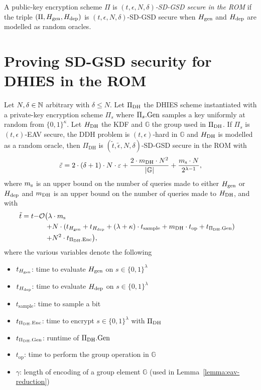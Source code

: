 \begin{definition}
	A public-key encryption scheme $\Pi$ is \emph{$(t, \epsilon, N, \delta)$-SD-GSD secure in the ROM} if the triple $(\Pi, H_\mathrm{gen}, H_\mathrm{dep})$ is $(t, \epsilon, N, \delta)$-SD-GSD secure when $H_\mathrm{gen}$ and $H_\mathrm{dep}$ are modelled as random oracles.
\end{definition}

\section{Proving SD-GSD security for DHIES in the ROM}


\begin{theorem} \label{theorem:sdgsd-security}
	Let $N, \delta \in \mathbb{N}$ arbitrary with $\delta \le N$. Let $\Pi_{\mathrm{DH}}$ the DHIES scheme instantiated with a private-key encryption scheme $\Pi_s$ where $\Pi_s.\mathrm{Gen}$ samples a key uniformly at random from $\{0, 1\}^\kappa$. Let $H_\mathrm{DH}$ the KDF and $\mathbb{G}$ the group used in $\Pi_{\mathrm{DH}}$. If $\Pi_s$ is $(t, \epsilon)$-EAV secure, the DDH problem is $(t, \epsilon)$-hard in $\mathbb{G}$ and $H_\mathrm{DH}$ is modelled as a random oracle, then $\Pi_{\mathrm{DH}}$ is $(\tilde{t}, \tilde{\epsilon}, N, \delta)$-SD-GSD secure in the ROM with
	\[
		\tilde{\varepsilon} = 2 \cdot (\delta + 1) \cdot N \cdot \varepsilon + \frac{2 \cdot m_\mathrm{DH} \cdot N^2}{\lvert\mathbb{G}\rvert} + \frac{m_\mathrm{s} \cdot N}{2^{\lambda - 1}},
	\]
	where $m_\mathrm{s}$ is an upper bound on the number of queries made to either $H_\mathrm{gen}$ or $H_\mathrm{dep}$ and $m_\mathrm{DH}$ is an upper bound on the number of queries made to $H_\mathrm{DH}$, and with
	\[
		\tilde{t} = t \begin{aligned}[t]
			- & \mathcal{O}
			\begin{aligned}[t]
				\big(  \lambda & \cdot m_\mathrm{s} \\ + & N \cdot (t_{H_\mathrm{gen}} + t_{H_\mathrm{dep}} + (\lambda + \kappa) \cdot t_{\mathrm{sample}} + m_\mathrm{DH} \cdot t_{\mathrm{op}} + t_{\Pi_{\mathrm{DH}}.\mathrm{Gen}})  \\ + & N^2 \cdot t_{\Pi_{\mathrm{DH}}.\mathrm{Enc}}\big), \\
			\end{aligned}
		\end{aligned}
	\]
	where the various variables denote the following
	\begin{itemize}
		\item $t_{H_\mathrm{gen}}$: time to evaluate $H_\mathrm{gen}$ on $s \in \{0, 1\}^\lambda$
		\item $t_{H_\mathrm{dep}}$: time to evaluate $H_\mathrm{dep}$ on $s \in \{0, 1\}^\lambda$
		\item $t_{\mathrm{sample}}$: time to sample a bit
		\item $t_{\Pi_{\mathrm{DH}}.\mathrm{Enc}}$: time to encrypt $s \in \{0, 1\}^\lambda$ with $\Pi_{\mathrm{DH}}$
		\item $t_{\Pi_{\mathrm{DH}}.\mathrm{Gen}}$: runtime of $\Pi_{\mathrm{DH}}.\mathrm{Gen}$
		\item $t_{\mathrm{op}}$: time to perform the group operation in $\mathbb{G}$
		\item $\gamma$: length of encoding of a group element $\mathbb{G}$ (used in Lemma~\ref{lemma:eav-reduction})
	\end{itemize}
\end{theorem}

